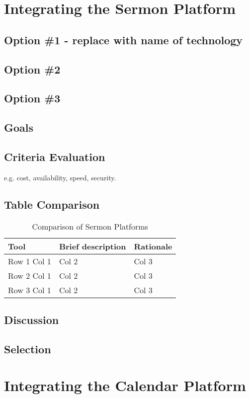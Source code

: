 \documentclass[letterpaper,10pt,draftclsnofoot,onecolumn,titlepage]{IEEEtran}
\begin{document}
	\section{Integrating the Sermon Platform}
	\subsection{Option \#1 - replace with name of technology}
	\subsection{Option \#2}
	\subsection{Option \#3}
	\subsection{Goals}
	\subsection{Criteria Evaluation}
	e.g. cost, availability, speed, security.
	\subsection{Table Comparison}
	\begin{table}[ht]
	\caption{Comparison of Sermon Platforms}
	\begin{center}
	\begin{tabular} { | m{3cm} | m{5cm} | m{5cm} | }
	\hline\hline
	Tool & Brief description & Rationale \\ [0.5ex]
	\hline
	Row 1 Col 1 & Col 2 & Col 3 \\
	\hline
	Row 2 Col 1 & Col 2 & Col 3 \\
	\hline
	Row 3 Col 1 & Col 2 & Col 3 \\
	\hline
	\end{tabular}
	\end{center}
	\end{table}
	\subsection{Discussion}
	\subsection{Selection}

	\section{Integrating the Calendar Platform}
\end{document}
